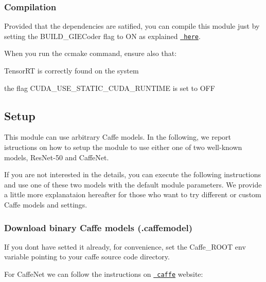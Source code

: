 \subsubsection*{Compilation}

Provided that the dependencies are satified, you can compile this module just by setting the {\ttfamily B\+U\+I\+L\+D\+\_\+\+G\+I\+E\+Coder} flag to {\ttfamily ON} as explained \href{https://www.github.com/robotology/himrep/README/\#compilation}{\texttt{ here}}.

When you run the {\ttfamily ccmake} command, ensure also that\+:


\begin{DoxyItemize}
\item {\ttfamily Tensor\+RT} is correctly found on the system
\item the flag {\ttfamily C\+U\+D\+A\+\_\+\+U\+S\+E\+\_\+\+S\+T\+A\+T\+I\+C\+\_\+\+C\+U\+D\+A\+\_\+\+R\+U\+N\+T\+I\+ME} is set to {\ttfamily O\+FF}
\end{DoxyItemize}

\subsection*{Setup}

This module can use arbitrary Caffe models. In the following, we report istructions on how to setup the module to use either one of two well-\/known models, {\ttfamily Res\+Net-\/50} and {\ttfamily Caffe\+Net}.

If you are not interested in the details, you can execute the following instructions and use one of these two models with the default module parameters. We provide a little more explanataion hereafter for those who want to try different or custom Caffe models and settings.

\subsubsection*{Download binary Caffe models (.caffemodel)}

If you don\textquotesingle{}t have setted it already, for convenience, set the {\ttfamily Caffe\+\_\+\+R\+O\+OT} env variable pointing to your {\ttfamily caffe} source code directory.

For {\ttfamily Caffe\+Net} we can follow the instructions on \href{http://caffe.berkeleyvision.org/model_zoo.html}{\texttt{ caffe}} website\+:


\begin{DoxyCode}{0}
\end{DoxyCode}


